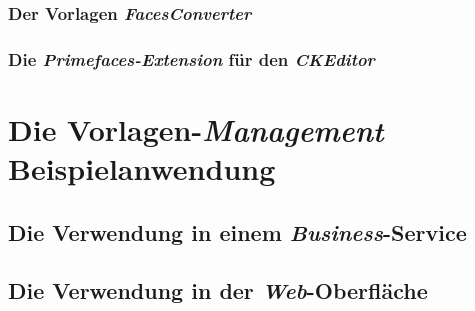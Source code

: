 \subsubsection{Der Vorlagen \emph{FacesConverter}}

\subsubsection{Die \emph{Primefaces-Extension} für den \emph{CKEditor}}


\section{Die Vorlagen-\emph{Management} Beispielanwendung}
\subsection{Die Verwendung in einem \emph{Business}-Service}
\subsection{Die Verwendung in der \emph{Web}-Oberfläche}